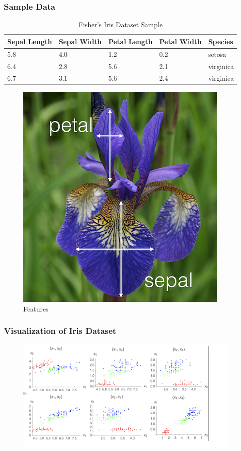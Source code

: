 \begin{frame}
\frametitle{Sample Data}

\begin{table}
\begin{tabular}{lllll}
\hline
\textbf{Sepal Length} & \textbf{ Sepal Width } & \textbf{Petal Length} & \textbf{Petal Width} & \textbf{Species}\\
\hline
5.8 & 4.0 & 1.2 & 0.2 & setosa\\
6.4 & 2.8 & 5.6 & 2.1 & virginica\\
6.7 & 3.1 & 5.6 & 2.4 & virginica \\
\hline
\end{tabular}
\caption{Fisher's Iris Dataset Sample}
\end{table}

\begin{figure}[htbp]
\centering
\includegraphics[scale=.23]{graphics/iris_feature} \caption{Features}
\end{figure}


\end{frame}
\begin{frame}
\frametitle{Visualization of Iris Dataset}
\begin{figure}[t]
\includegraphics[scale=0.5]{graphics/feature_vis}
\centering
\end{figure}
\end{frame}

